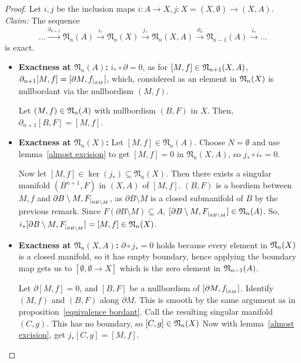 \documentclass[a4paper,11pt]{article}
\begin{document}
\begin{proof}\cite{dieck}
    Let \(i,j\) be the inclusion maps \(i:A\to X, j:X=(X,\emptyset)\to(X,A)\).\\
    \textit{Claim:} The sequence
    \[\dots\xrightarrow{\partial_{n+1}}\mathfrak{N}_n(A)\xrightarrow{i_\ast}\mathfrak{N}_n(X)\xrightarrow{j_\ast}\mathfrak{N}_n(X,A)\xrightarrow{\partial_n}\mathfrak{N}_{n-1}(A)\xrightarrow{i_\ast}\dots\]
    is exact.
    \begin{itemize}
        \item \textbf{Exactness at \(\mathfrak{N}_n(A)\):}
        \(i_\ast\circ \partial=0\), as for \([M,f]\in\mathfrak{N}_{n+1}(X,A)\), \(\partial_{n+1} [M,f]=[\partial M,f_{|_{\partial M}}]\), which, considered as an element in \(\mathfrak{N}_n(X)\) is nullbordant via the nullbordism \((M,f)\).

        Let \((M,f)\in\mathfrak{N}_n(A)\) with nullbordism \((B,F)\) in \(X\). Then, \(\partial_{n+1}[B,F]=[M,f]\).

        \item \textbf{Exactness at \(\mathfrak{N}_n(X)\):} Let \([M,f]\in\mathfrak{N}_n(A)\). Choose \(N=\emptyset\) and use lemma\ \ref{almost excision} to get \([M,f]=0\) in \(\mathfrak{N}_n(X,A)\), so \(j_\ast\circ i_\ast=0\).
        
        Now let \([M,f]\in\ker(j_\ast)\subseteq \mathfrak{N}_n(X)\). Then there exists a singular manifold \((B^{n+1},F)\) in \((X,A)\) of \([M,f]\). \((B,F)\) is a bordism between \(M,f\) and \(\partial B\setminus M,F_{|_{\partial B\setminus M}}\), as \(\partial B\setminus M\) is a closed submanifold of \(B\) by the previous remark. 
        Since \(F(\partial B\setminus M)\subseteq A\), \([\partial B\setminus M,F_{|_{\partial B\setminus M}}]\in\mathfrak{N}_n(A)\). So, \(i_\ast[\partial B\setminus M,F_{|_{\partial B\setminus M}}]=[M,f]\in\mathfrak{N}_n(X)\).

        \item \textbf{Exactness at \(\mathfrak{N}_n(X,A)\):} \(\partial \circ j_\ast=0\) holds because every element in \(\mathfrak{N}_n(X)\) is a closed manifold, so it has empty boundary, hence applying the boundary map gets us to \([\emptyset,\emptyset\to X]\) which is the zero element in \(\mathfrak{N}_{n-1}(A)\).
        
        Let \(\partial[M,f]=0\), and \([B,F]\) be a nullbordism of \([\partial M, f_{|_{\partial M}}]\). Identify \((M,f)\) and \((B,F)\) along \(\partial M\). This is smooth by the same argument as in proposition\ \ref{equivalence bordant}. Call the resulting singular manifold \((C,g)\). This has no boundary, so \([C,g]\in\mathfrak{N}_n(X)\) Now with lemma\ \ref{almost excision}, get \(j_\ast[C,g]=[M,f]\).
    \end{itemize}
\end{proof}
\end{document}
